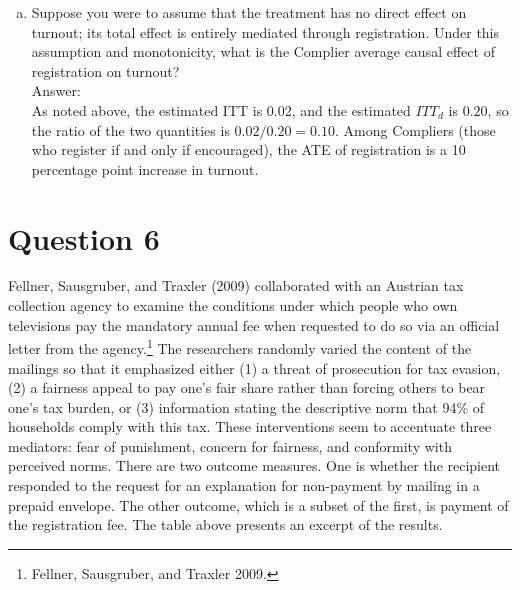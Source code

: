 \documentclass[11pt,notitlepage]{article}\usepackage[]{graphicx}\usepackage[]{color}
\begin{document}
\begin{enumerate}[a)]
\item Suppose you were to assume that the treatment has no direct effect on turnout; its total effect is entirely mediated through registration. Under this assumption and monotonicity, what is the Complier average causal effect of registration on turnout?\\
Answer:\\
As noted above, the estimated ITT is 0.02, and the estimated $ITT_d$ is $0.20$, so the ratio of the two quantities is $0.02/0.20 = 0.10$.  Among Compliers (those who register if and only if encouraged), the ATE of registration is a 10 percentage point increase in turnout.


\end{enumerate}

\section*{Question 6}
Fellner, Sausgruber, and Traxler (2009) collaborated with an Austrian tax collection agency to examine the conditions under which people who own televisions pay the mandatory annual fee when requested to do so via an official letter from the agency.\footnote{Fellner, Sausgruber, and Traxler 2009.} The researchers randomly varied the content of the mailings so that it emphasized either (1) a threat of prosecution for tax evasion, (2) a fairness appeal to pay one's fair share rather than forcing others to bear one's tax burden, or (3) information stating the descriptive norm that 94\% of households comply with this tax. These interventions seem to accentuate three mediators: fear of punishment, concern for fairness, and conformity with perceived norms. There are two outcome measures. One is whether the recipient responded to the request for an explanation for non-payment by mailing in a prepaid envelope. The other outcome, which is a subset of the first, is payment of the registration fee. The table above presents an excerpt of the results.
\end{document}

